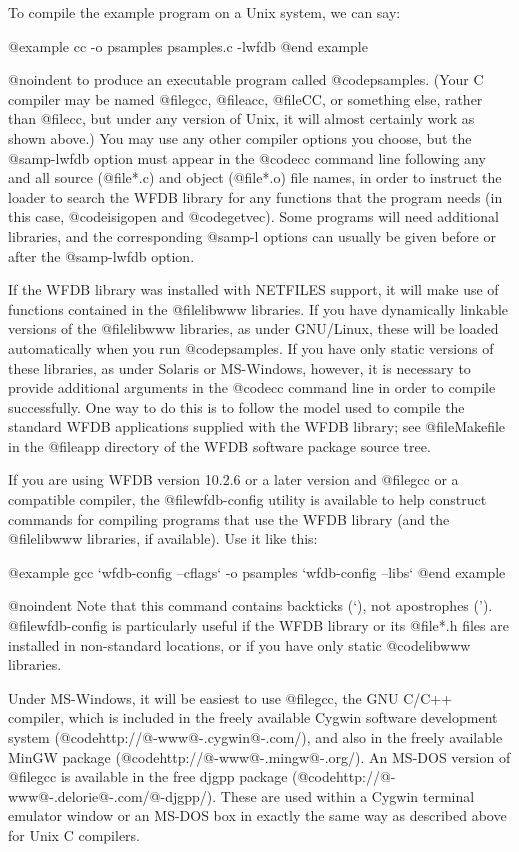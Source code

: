 {{To compile the example program on a Unix system, we can say:

@example
cc -o psamples psamples.c -lwfdb
@end example

@noindent
to produce an executable program called @code{psamples}.  (Your C
compiler may be named @file{gcc}, @file{acc}, @file{CC}, or something
else, rather than @file{cc}, but under any version of Unix, it will
almost certainly work as shown above.)  You may use any other compiler
options you choose, but the @samp{-lwfdb} option must appear in the
@code{cc} command line following any and all source (@file{*.c}) and
object (@file{*.o}) file names, in order to instruct the loader to
search the WFDB library for any functions that the program needs (in
this case, @code{isigopen} and @code{getvec}).  Some programs will need
additional libraries, and the corresponding @samp{-l} options can
usually be given before or after the @samp{-lwfdb} option.

If the WFDB library was installed with NETFILES support, it will make
use of functions contained in the @file{libwww} libraries.  If you have
dynamically linkable versions of the @file{libwww} libraries, as under
GNU/Linux, these will be loaded automatically when you run
@code{psamples}.  If you have only static versions of these libraries,
as under Solaris or MS-Windows, however, it is necessary to provide
additional arguments in the @code{cc} command line in order to compile
successfully.  One way to do this is to follow the model used to compile
the standard WFDB applications supplied with the WFDB library; see
@file{Makefile} in the @file{app} directory of the WFDB software package
source tree.

If you are using WFDB version 10.2.6 or a later version and @file{gcc}
or a compatible compiler, the @file{wfdb-config} utility is available
to help construct commands for compiling programs that use the WFDB
library (and the @file{libwww} libraries, if available).  Use it like
this:

@example
gcc `wfdb-config --cflags` -o psamples `wfdb-config --libs`
@end example

@noindent
Note that this command contains backticks (`), not apostrophes (').
@file{wfdb-config} is particularly useful if the WFDB library or
its @file{*.h} files are installed in non-standard locations, or if
you have only static @code{libwww} libraries.

Under MS-Windows, it will be easiest to use @file{gcc}, the GNU C/C++
compiler, which is included in the freely available Cygwin software
development system (@code{http://@-www@-.cygwin@-.com/}),
and also in the freely available MinGW package
(@code{http://@-www@-.mingw@-.org/}).  An MS-DOS version of @file{gcc}
is available in the free djgpp package
(@code{http://@-www@-.delorie@-.com/@-djgpp/}). These are used within a
Cygwin terminal emulator window or an MS-DOS box in exactly the same way
as described above for Unix C compilers.  

}}
